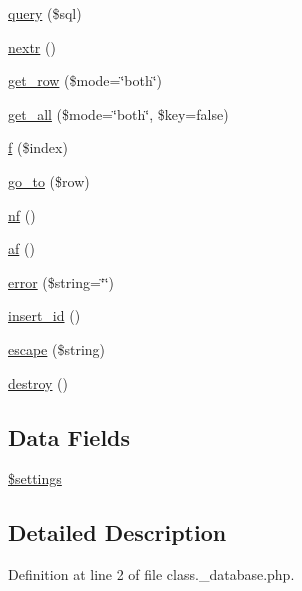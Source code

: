 \begin{DoxyCompactItemize}
\item 
\hyperlink{class__database_a6b251c8058230359b2922377699c4f29}{query} (\$sql)
\item 
\hyperlink{class__database_aea18ceaf3a26a43a17ac75a1deae8eb5}{nextr} ()
\item 
\hyperlink{class__database_af3975c6052edb19e579b858ade41a833}{get\_\-row} (\$mode=\char`\"{}both\char`\"{})
\item 
\hyperlink{class__database_aab759ecaf5cca95ae93a43f3ae01eb1c}{get\_\-all} (\$mode=\char`\"{}both\char`\"{}, \$key=false)
\item 
\hyperlink{class__database_a2470114c975ff2d134f750d82b92ab13}{f} (\$index)
\item 
\hyperlink{class__database_af63fb7393e4693d1f2f2a324e3b3f3f2}{go\_\-to} (\$row)
\item 
\hyperlink{class__database_a488ba76d7261d5bd6a2d01ab8dd6da0d}{nf} ()
\item 
\hyperlink{class__database_aa186461b75e39e01df8ec9d05bc56e5f}{af} ()
\item 
\hyperlink{class__database_ad4b2a8a3e107f7ed256cb345303c82cd}{error} (\$string=\char`\"{}\char`\"{})
\item 
\hyperlink{class__database_a933f2cde8dc7f87875e257d0a4902e99}{insert\_\-id} ()
\item 
\hyperlink{class__database_a812cda4574715397b7ffd0be994adf10}{escape} (\$string)
\item 
\hyperlink{class__database_aa118461de946085fe42989193337044a}{destroy} ()
\end{DoxyCompactItemize}
\subsection*{Data Fields}
\begin{DoxyCompactItemize}
\item 
\hyperlink{class__database_ac7c3353107070daa85f641882931b358}{\$settings}
\end{DoxyCompactItemize}


\subsection{Detailed Description}


Definition at line 2 of file class.\_\-database.php.



